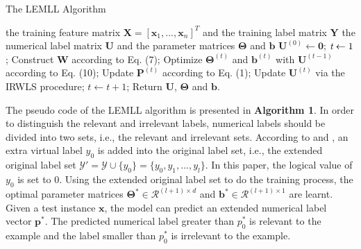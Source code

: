\documentclass[conference]{IEEEtran}
\begin{document}
\renewcommand{\algorithmicrequire}{ \textbf{Input:}} %
\renewcommand{\algorithmicensure}{ \textbf{Output:}} %
\begin{algorithm}[h]
  \caption{The LEMLL Algorithm}
  \begin{algorithmic}[1]
    \REQUIRE
      the training feature matrix $\bm{X}=[\bm{x}_1,...,\bm{x}_n]^T$ and the training label matrix $\bm{Y}$
    \ENSURE
      the numerical label matrix $\bm{U}$ and the parameter matrices $\bm{\Theta}$ and $\bm{b}$
    \STATE $\bm{U}^{(0)}\leftarrow\bm{0}$; $\emph{t}\leftarrow 1$;
    \STATE Construct $\bm{W}$ according to Eq. (7);
    \REPEAT
      \STATE Optimize $\bm{\Theta}^{(t)}$ and $\bm{b}^{(t)}$ with $\bm{U}^{(t-1)}$ according to Eq. (10);
      \STATE Update $\bm{P}^{(t)}$ according to Eq. (1);
      \STATE Update $\bm{U}^{(t)}$ via the IRWLS procedure;
      \STATE $t\leftarrow t+1$;
    \STATE Return $\bm{U}$, $\bm{\Theta}$ and $\bm{b}$.
  \end{algorithmic}
\end{algorithm}

The pseudo code of the LEMLL algorithm is presented in \textbf{Algorithm 1}. In order to distinguish the relevant and irrelevant labels, numerical labels should be divided into two sets, i.e., the relevant and irrelevant sets. According to \cite{furnkranz2008multilabel} and \cite{li2015leveraging}, an extra virtual label $y_0$ is added into the original label set, i.e., the extended original label set $\mathcal{Y}' = \mathcal{Y} \cup \{y_0\} = \{y_0,y_1,...,y_l\}$. In this paper, the logical value of $y_0$ is set to 0. Using the extended original label set to do the training process, the optimal parameter matrices $\bm{\Theta}^{*} \in \mathcal{R}^{(l+1) \times d}$ and $\bm{b}^{*} \in \mathcal{R}^{(l+1)\times 1}$ are learnt. Given a test instance $\bm{x}$, the model can predict an extended numerical label vector $\bm{p}^*$. The predicted numerical label greater than $p_0^{*}$ is relevant to the example and the label smaller than $p_0^{*}$ is irrelevant to the example.
\end{document}
